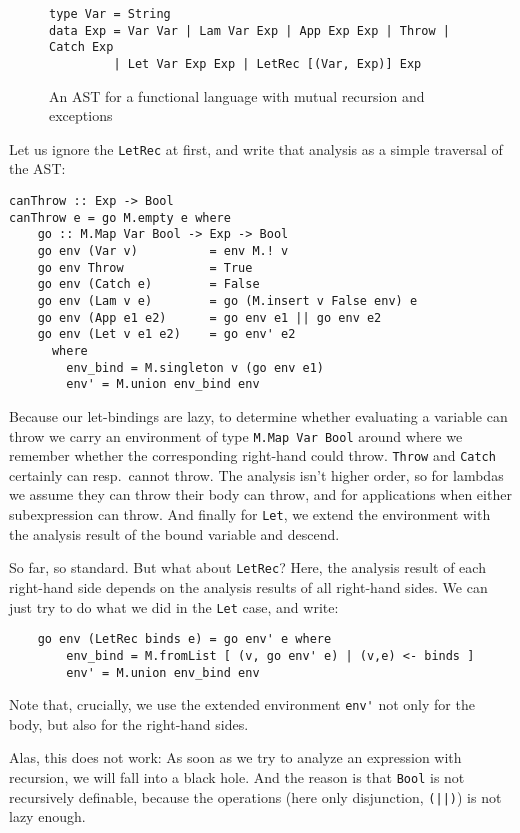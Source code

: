 \documentclass[manuscript,screen,acmsmall]{acmart}
\begin{document}
\begin{figure}
\begin{verbatim}
type Var = String
data Exp = Var Var | Lam Var Exp | App Exp Exp | Throw | Catch Exp
         | Let Var Exp Exp | LetRec [(Var, Exp)] Exp
\end{verbatim}
\caption{An AST for a functional language with mutual recursion and exceptions}
\label{fig:analast}
\end{figure}

Let us ignore the \verb|LetRec| at first, and write that analysis as a simple traversal of the AST:
\begin{verbatim}
canThrow :: Exp -> Bool
canThrow e = go M.empty e where
    go :: M.Map Var Bool -> Exp -> Bool
    go env (Var v)          = env M.! v
    go env Throw            = True
    go env (Catch e)        = False
    go env (Lam v e)        = go (M.insert v False env) e
    go env (App e1 e2)      = go env e1 || go env e2
    go env (Let v e1 e2)    = go env' e2
      where
        env_bind = M.singleton v (go env e1)
        env' = M.union env_bind env
\end{verbatim}

Because our let-bindings are lazy, to determine whether evaluating a variable can throw we carry an environment of type \verb|M.Map Var Bool| around where we remember whether the corresponding right-hand could throw. \verb|Throw| and \verb|Catch| certainly can resp.\ cannot throw. The analysis isn't higher order, so for lambdas we assume they can throw their body can throw, and for applications when either subexpression can throw. And finally for \verb|Let|, we extend the environment with the analysis result of the bound variable and descend.

So far, so standard. But what about \verb|LetRec|? Here, the analysis result of each right-hand side depends on the analysis results of all right-hand sides. We can just try to do what we did in the \verb|Let| case, and write:
\begin{verbatim}
    go env (LetRec binds e) = go env' e where
        env_bind = M.fromList [ (v, go env' e) | (v,e) <- binds ]
        env' = M.union env_bind env
\end{verbatim}
Note that, crucially, we use the extended environment \verb|env'| not only for the body, but also for the right-hand sides.

Alas, this does not work: As soon as we try to analyze an expression with recursion, we will fall into a black hole. And the reason is that \verb|Bool| is not recursively definable, because the operations (here only disjunction, \verb+(||)+) is not lazy enough.
\end{document}
